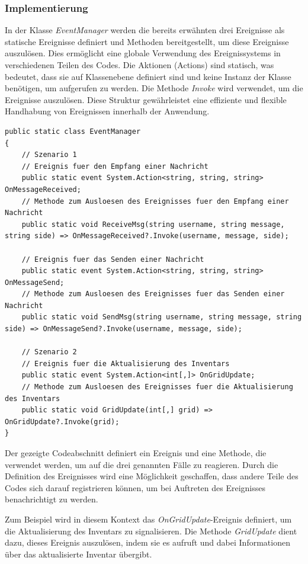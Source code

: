 \subsubsection*{Implementierung}

In der Klasse \textit{EventManager} werden die bereits erwähnten drei Ereignisse als statische Ereignisse definiert und Methoden bereitgestellt, um diese Ereignisse auszulösen. Dies ermöglicht eine globale Verwendung des Ereignissystems in verschiedenen Teilen des Codes. Die Aktionen (Actions) sind statisch, was bedeutet, dass sie auf Klassenebene definiert sind und keine Instanz der Klasse benötigen, um aufgerufen zu werden. Die Methode \textit{Invoke} wird verwendet, um die Ereignisse auszulösen. Diese Struktur gewährleistet eine effiziente und flexible Handhabung von Ereignissen innerhalb der Anwendung.

\begin{lstlisting}[style=csharp, label=code:EventManager]
public static class EventManager
{
    // Szenario 1
    // Ereignis fuer den Empfang einer Nachricht
    public static event System.Action<string, string, string> OnMessageReceived;
    // Methode zum Ausloesen des Ereignisses fuer den Empfang einer Nachricht
    public static void ReceiveMsg(string username, string message, string side) => OnMessageReceived?.Invoke(username, message, side);

    // Ereignis fuer das Senden einer Nachricht
    public static event System.Action<string, string, string> OnMessageSend;
    // Methode zum Ausloesen des Ereignisses fuer das Senden einer Nachricht
    public static void SendMsg(string username, string message, string side) => OnMessageSend?.Invoke(username, message, side);

    // Szenario 2
    // Ereignis fuer die Aktualisierung des Inventars
    public static event System.Action<int[,]> OnGridUpdate;
    // Methode zum Ausloesen des Ereignisses fuer die Aktualisierung des Inventars
    public static void GridUpdate(int[,] grid) => OnGridUpdate?.Invoke(grid);
}
\end{lstlisting}

Der gezeigte Codeabschnitt definiert ein Ereignis und eine Methode, die verwendet werden, um auf die drei genannten Fälle zu reagieren. Durch die Definition des Ereignisses wird eine Möglichkeit geschaffen, dass andere Teile des Codes sich darauf registrieren können, um bei Auftreten des Ereignisses benachrichtigt zu werden.

Zum Beispiel wird in diesem Kontext das \textit{OnGridUpdate}-Ereignis definiert, um die Aktualisierung des Inventars zu signalisieren. Die Methode \textit{GridUpdate} dient dazu, dieses Ereignis auszulösen, indem sie es aufruft und dabei Informationen über das aktualisierte Inventar übergibt.

